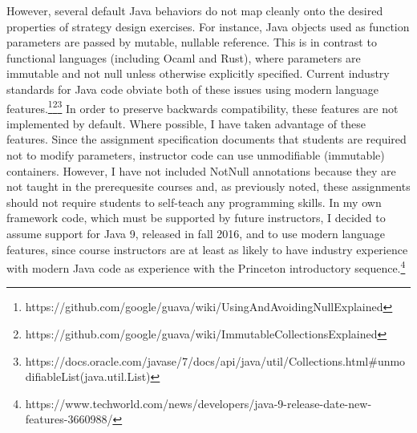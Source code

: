 \documentclass[pageno]{jpaper}
\begin{document}
However, several default Java behaviors do not map cleanly onto the desired properties of strategy design exercises.
For instance, Java objects used as function parameters are passed by mutable, nullable reference.
This is in contrast to functional languages (including Ocaml and Rust), where parameters are immutable and not null unless otherwise explicitly specified.
Current industry standards for Java code obviate both of these issues using modern language features.\footnote{https://github.com/google/guava/wiki/UsingAndAvoidingNullExplained}\footnote{https://github.com/google/guava/wiki/ImmutableCollectionsExplained}\footnote{https://docs.oracle.com/javase/7/docs/api/java/util/Collections.html#unmodifiableList(java.util.List)}
In order to preserve backwards compatibility, these features are not implemented by default.
Where possible, I have taken advantage of these features.
Since the assignment specification documents that students are required not to modify parameters, instructor code can use unmodifiable (immutable) containers.
However, I have not included NotNull annotations because they are not taught in the prerequesite courses and, as previously noted, these assignments should not require students to self-teach any programming skills.
In my own framework code, which must be supported by future instructors, I decided to assume support for Java 9, released in fall 2016, and to use modern language features, since course instructors are at least as likely to have industry experience with modern Java code as experience with the Princeton introductory sequence.\footnote{https://www.techworld.com/news/developers/java-9-release-date-new-features-3660988/}
\end{document}
